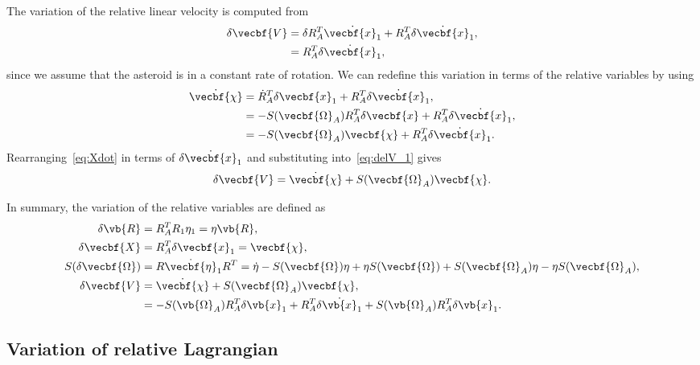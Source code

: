 \documentclass[11pt, reqno]{article}    %
\begin{document}
The variation of the relative linear velocity is computed from 
\begin{align}\label{eq:delV_1}
    \delta \vecbf{V} &= \delta R_A^T \dot{\vecbf{x}_1} + R_A^T \delta \dot{\vecbf{x}}_1 , \nonumber \\
    &= R_A^T \delta \dot{\vecbf{x}}_1 ,
\end{align}
since we assume that the asteroid is in a constant rate of rotation.
We can redefine this variation in terms of the relative variables by using
\begin{align}\label{eq:Xdot}
    \dot{\vecbf{\chi}} &= \dot{R}_A^T \delta \vecbf{x}_1 + R_A^T \delta \dot{\vecbf{x}}_1 , \nonumber \\
    &= -S(\vecbf{\Omega}_A) R_A^T \delta \vecbf{x} + R_A^T \delta \dot{\vecbf{x}}_1 ,\nonumber \\
    &= -S(\vecbf{\Omega}_A) \vecbf{\chi} + R_A^T \delta \dot{\vecbf{x}}_1 .
\end{align}
Rearranging~\cref{eq:Xdot} in terms of \( \delta \dot{\vecbf{x}}_1\) and substituting into~\cref{eq:delV_1} gives
\begin{align}\label{eq:relative_velocity_variation}
    \delta \vecbf{V} = \dot{\vecbf{\chi}} + S(\vecbf{\Omega}_A) \vecbf{\chi} .
\end{align}

In summary, the variation of the relative variables are defined as
\begin{align*}
    \delta \vb{R} &= R_A^T R_1 \eta_1 = \eta \vb{R} ,\\
    \delta \vecbf{X} &= R_A^T \delta \vecbf{x}_1 = \vecbf{\chi} , \\
    S(\delta \vecbf{\Omega}) &= R \dot{\vecbf{\eta}}_1 R^T = \dot{\eta} - S(\vecbf{\Omega}) \eta + \eta S(\vecbf{\Omega}) +  S(\vecbf{\Omega}_A) \eta - \eta S(\vecbf{\Omega}_A) , \\
    \delta \vecbf{V} &= \dot{\vecbf{\chi}} + S(\vecbf{\Omega}_A) \vecbf{\chi} , \\
    &= -S(\vb{\Omega}_A) R_A^T \delta \vb{x}_1 + R_A^T \delta \dot{\vb{x}}_1 + S(\vb{\Omega}_A) R_A^T \delta \vb{x}_1.
\end{align*}
\subsection{Variation of relative Lagrangian}\label{ssec:var_rel_lagrangian}
\end{document}
